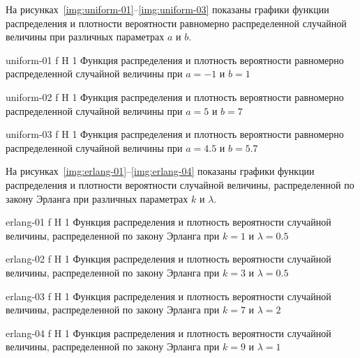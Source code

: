 \documentclass{bmstu}
\begin{document}
На рисунках~\ref{img:uniform-01}--\ref{img:uniform-03} показаны графики функции распределения и плотности вероятности равномерно распределенной случайной величины при различных параметрах $a$ и $b$.

    {uniform-01}
    {f}
    {H}
    {1\textwidth}
    {Функция распределения и плотность вероятности равномерно распределенной случайной величины при $a = -1$ и $b = 1$}
    
    {uniform-02}
    {f}
    {H}
    {1\textwidth}
    {Функция распределения и плотность вероятности равномерно распределенной случайной величины при $a = 5$ и $b = 7$}
    
    {uniform-03}
    {f}
    {H}
    {1\textwidth}
    {Функция распределения и плотность вероятности равномерно распределенной случайной величины при $a = 4.5$ и $b = 5.7$}
    
На рисунках~\ref{img:erlang-01}--\ref{img:erlang-04} показаны графики функции распределения и плотности вероятности случайной величины, распределенной по закону Эрланга при различных параметрах $k$ и $\lambda$.

    {erlang-01}
    {f}
    {H}
    {1\textwidth}
    {Функция распределения и плотность вероятности случайной величины, распределенной по закону Эрланга при $k = 1$ и $\lambda = 0.5$}
    
    {erlang-02}
    {f}
    {H}
    {1\textwidth}
    {Функция распределения и плотность вероятности случайной величины, распределенной по закону Эрланга при $k = 3$ и $\lambda = 0.5$}  
    
    {erlang-03}
    {f}
    {H}
    {1\textwidth}
    {Функция распределения и плотность вероятности случайной величины, распределенной по закону Эрланга при $k = 7$ и $\lambda = 2$}
    
    {erlang-04}
    {f}
    {H}
    {1\textwidth}
    {Функция распределения и плотность вероятности случайной величины, распределенной по закону Эрланга при $k = 9$ и $\lambda = 1$}
\end{document}

